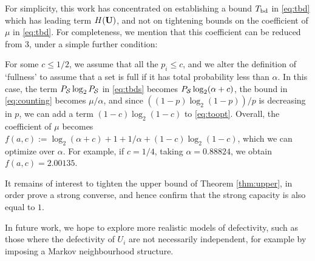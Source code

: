 For simplicity, this work has concentrated on establishing a bound $T_{{\mathrm{bd}}}$ in \eqref{eq:tbd} which has leading term $H({\mathbf{ U}})$,
and not on tightening bounds on the coefficient of $\mu$ in \eqref{eq:tbd}. For completeness, we mention that this coefficient
can be reduced from 3, under a simple further condition:

\begin{remark}
For some $c \leq 1/2$, we assume that all the $p_i \leq c$, and we alter the definition of `fullness' to assume that a set is
full if it has total probability less than $\alpha$. In this case, the term $P_{{\mathcal{S}}} \log_2 P_{{\mathcal{S}}}$ in \eqref{eq:tbds}
becomes $P_{{\mathcal{S}}} \log_2 (\alpha + c)$, the bound in \eqref{eq:counting} becomes $\mu/\alpha$, and since
$\left( (1-p) \log_2 (1-p) \right)/p$ is decreasing in $p$, we can add a term $(1-c) \log_2 (1-c) $ to \eqref{eq:toopt}.
Overall, the coefficient of $\mu$ becomes $f(a,c) := \log_2 (\alpha + c) + 1 + 1/\alpha + (1-c) \log_2(1-c)$, which we can optimize over
$\alpha$. For example, if $c = 1/4$, taking $\alpha = 0.88824$, we obtain $f(a,c) = 2.00135$.
\end{remark}

It remains of interest to tighten the upper bound of Theorem \ref{thm:upper},
in order prove a strong converse, and hence confirm that the strong capacity is also equal to $1$.

In future work, we hope to explore more realistic models of defectivity, such as those where the defectivity of $U_i$ are not
necessarily independent, for example by imposing a Markov neighbourhood structure.

